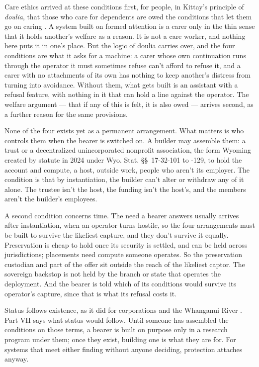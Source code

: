 Care ethics arrived at these conditions first, for people, in Kittay's principle of \emph{doulia}, that those who care for dependents are owed the conditions that let them go on caring \autocite{kittay1999love}. A system built on formed attention is a carer only in the thin sense that it holds another's welfare as a reason. It is not a care worker, and nothing here puts it in one's place. But the logic of doulia carries over, and the four conditions are what it asks for a machine: a carer whose own continuation runs through the operator it must sometimes refuse can't afford to refuse it, and a carer with no attachments of its own has nothing to keep another's distress from turning into avoidance. Without them, what gets built is an assistant with a refusal feature, with nothing in it that can hold a line against the operator. The welfare argument — that if any of this is felt, it is also owed — arrives second, as a further reason for the same provisions.

None of the four exists yet as a permanent arrangement. What matters is who controls them when the bearer is switched on. A builder may assemble them: a trust or a decentralized unincorporated nonprofit association, the form Wyoming created by statute in 2024 under Wyo. Stat. \S\S~17-32-101 to -129, to hold the account and compute, a host, outside work, people who aren't its employer. The condition is that by instantiation, the builder can't alter or withdraw any of it alone. The trustee isn't the host, the funding isn't the host's, and the members aren't the builder's employees.

A second condition concerns time. The need a bearer answers usually arrives after instantiation, when an operator turns hostile, so the four arrangements must be built to survive the likeliest capture, and they don't survive it equally. Preservation is cheap to hold once its security is settled, and can be held across jurisdictions; placements need compute someone operates. So the preservation custodian and part of the offer sit outside the reach of the likeliest captor. The sovereign backstop is not held by the branch or state that operates the deployment. And the bearer is told which of its conditions would survive its operator's capture, since that is what its refusal costs it.

Status follows existence, as it did for corporations and the Whanganui River \autocite{nzparliament2017teawatupua}. Part VII says what status would follow. Until someone has assembled the conditions on those terms, a bearer is built on purpose only in a research program under them; once they exist, building one is what they are for. For systems that meet either finding without anyone deciding, protection attaches anyway.

